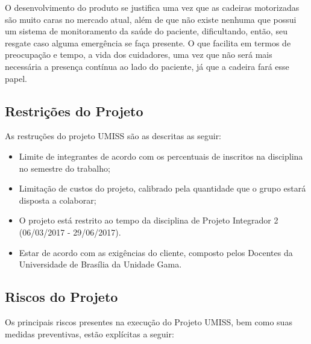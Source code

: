 O desenvolvimento do produto se justifica uma vez que as cadeiras motorizadas 
são muito caras no mercado atual, além de que não existe nenhuma que possui 
um sistema de monitoramento da saúde do paciente, dificultando, então, seu 
resgate caso alguma emergência se faça presente. O que facilita em termos de 
preocupação e tempo, a vida dos cuidadores, uma vez que não será mais necessária
a presença contínua ao lado do paciente, já que a cadeira fará esse papel.

\subsection{Restrições do Projeto}
As restruções do projeto UMISS são as descritas as seguir:
\begin{itemize}
    \item Limite de integrantes de acordo com os percentuais de inscritos na disciplina no semestre do trabalho;
    \item Limitação de custos do projeto, calibrado pela quantidade que o grupo estará disposta a colaborar;
    \item O projeto está restrito ao tempo da disciplina de Projeto Integrador
   2 (06/03/2017 - 29/06/2017).
    \item Estar de acordo com as exigências do cliente, composto pelos Docentes
    da Universidade de Brasília da Unidade Gama.
\end{itemize}

\subsection{Riscos do Projeto}
Os principais riscos presentes na execução do Projeto UMISS, bem como suas medidas preventivas, estão explícitas a seguir:

